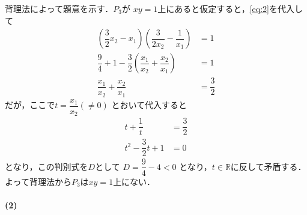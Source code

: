 \documentclass[../../main.tex]{subfiles}
\begin{document}
背理法によって題意を示す．$P_3$が $xy=1$上にあると仮定すると，\cref{eq:2}を代入して
\begin{align}
  \left(\dfrac{3}{2}x_2 - x_1\right) \left(\dfrac{3}{2x_2} - \dfrac{1}{x_1}\right) &= 1 \\
  \dfrac{9}{4} + 1 - \dfrac{3}{2}\left(\dfrac{x_1}{x_2} + \dfrac{x_2}{x_1}\right) &= 1 \\
  \dfrac{x_1}{x_2} + \dfrac{x_2}{x_1} &= \dfrac{3}{2} \label{eq:3}
\end{align}
だが，ここで$t = \dfrac{x_1}{x_2} (\neq 0)$ とおいて代入すると
\begin{align}
  t + \dfrac{1}{t} &= \dfrac{3}{2} \\
  t^2 - \dfrac{3}{2}t + 1 &= 0
\end{align}
となり，この判別式を$D$として $D = \dfrac{9}{4} - 4 < 0$ となり，$t \in \mathbb{R}$に反して矛盾する．よって背理法から$P_3$は$xy=1$上にない．

\paragraph{(2)}
\end{document}
